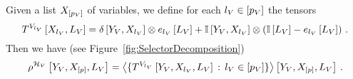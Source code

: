 \begin{theorem}\label{the:varSelectorDecomposition}
	Given a list $X_{[p_{V}]}$ of variables, we define for each $l_{V}\in[p_{V}]$ the tensors
		\[ T^{V_{l_{V}}}\left[X_{l_{V}},L_{V}\right] 
		= \delta\left[Y_{V},X_{l_{V}}\right] \otimes e_{l_{V}}\left[L_{V}\right] 
		+ \mathbb{I}\left[Y_{V},X_{l_{V}}\right] \otimes \left(\mathbb{I}\left[L_{V}\right] - e_{l_{V}}\left[L_{V}\right] \right) \, . 
		\]
	Then we have (see Figure~\ref{fig:SelectorDecomposition})
		\[ \rho^{\mathcal{H}_{V}}\left[Y_{V},X_{[p]},L_{V}\right] 
		= \left\langle 
			\{T^{V_{l_{V}}}\left[Y_{V},X_{l_{V}},L_{V}\right] \, : \, l_{V}\in[p_{V}]\}
		\right\rangle \left[ Y_{V},X_{[p]},L_{V} \right] \, . 
		\]
\end{theorem}
